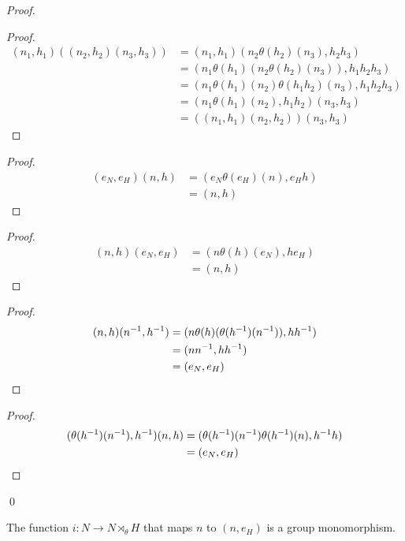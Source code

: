 \begin{proof}
\pf
{}
\begin{proof}
	\pf
	\begin{align*}
		(n_1,h_1) ((n_2,h_2)(n_3,h_3))
		& = (n_1,h_1)(n_2 \theta(h_2)(n_3), h_2 h_3) \\
		& = (n_1 \theta(h_1)(n_2 \theta(h_2)(n_3)), h_1 h_2 h_3) \\
		& = (n_1 \theta(h_1)(n_2) \theta(h_1h_2)(n_3), h_1 h_2 h_3) \\
		& = (n_1 \theta(h_1)(n_2), h_1 h_2)(n_3, h_3) \\
		& = ((n_1,h_1) (n_2,h_2)) (n_3,h_3)
	\end{align*}
\end{proof}
\begin{proof}
	\pf
	\begin{align*}
		(e_N,e_H)(n,h) & = (e_N \theta(e_H)(n), e_Hh) \\
		& = (n,h)
	\end{align*}
\end{proof}
\begin{proof}
	\pf
	\begin{align*}
		(n,h)(e_N,e_H) & = (n \theta(h)(e_N), h e_H) \\
		& = (n,h)
	\end{align*}
\end{proof}
\begin{proof}
	\pf
	\begin{align*}
		(n,h)({n}^{-1},{h}^{-1}) & = (n \theta(h)(\theta({h}^{-1})({n}^{-1})), h {h}^{-1}) \\
		& = (n {n}^{-1}, h {h}^{-1}) \\
		& = (e_N, e_H)
	\end{align*}
\end{proof}
\begin{proof}
	\pf
	\begin{align*}
		(\theta({h}^{-1})({n}^{-1}), {h}^{-1})(n,h) & = (\theta({h}^{-1})({n}^{-1}) \theta({h}^{-1})(n), {h}^{-1}h) \\
		& = (e_N,e_H)
	\end{align*}
\end{proof}
\qed
\end{proof}

\begin{prop}
The function $i : N \rightarrow N \rtimes_\theta H$ that maps $n$ to $(n,e_H)$ is a group monomorphism.
\end{prop}

